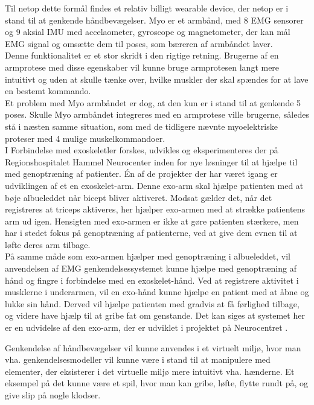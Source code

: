 Til netop dette formål findes et relativ billigt wearable device, der netop er i stand til at genkende håndbevægelser. Myo er et armbånd, med 8 EMG sensorer og 9 aksial IMU med accelaometer, gyroscope og magnetometer, der kan mål EMG signal og omsætte dem til poses, som bæreren af armbåndet laver. \\
Denne funktionalitet er et stor skridt i den rigtige retning. Brugerne af en armprotese med disse egenskaber vil kunne bruge armprotesen langt mere intuitivt og uden at skulle tænke over, hvilke muskler der skal spændes for at lave en bestemt kommando.\\
Et problem med Myo armbåndet er dog, at den kun er i stand til at genkende 5 poses. Skulle Myo armbåndet integreres med en armprotese ville brugerne, således stå i næsten samme situation, som med de tidligere nævnte myoelektriske proteser med 4 mulige muskelkommandoer.\\

I Forbindelse med exoskeletler forskes, udvikles og eksperimenteres der på Regionshospitalet Hammel Neurocenter inden for nye løsninger til at hjælpe til med genoptræning af patienter. Én af de projekter der har været igang er udviklingen af et en exoskelet-arm. Denne exo-arm skal hjælpe patienten med at bøje albueleddet når bicept bliver aktiveret. Modsat gælder det, når det registreres at triceps aktiveres, her hjælper exo-armen med at strække patientens arm ud igen. Hensigten med exo-armen er ikke at gøre patienten stærkere, men har i stedet fokus på genoptræning af patienterne, ved at give dem evnen til at løfte deres arm tilbage.\\

På samme måde som exo-armen hjælper med genoptræning i albueleddet, vil anvendelsen af EMG genkendelsessystemet kunne hjælpe med genoptræning af hånd og fingre i forbindelse med en exoskelet-hånd. Ved at registrere aktivitet i musklerne i underarmen, vil en exo-hånd kunne hjælpe en patient med at åbne og lukke sin hånd. Derved vil hjælpe patienten med gradvis at få førlighed tilbage, og videre have hjælp til at gribe fat om genstande. Det kan siges at systemet her er en udvidelse af den exo-arm, der er udviklet i projektet på Neurocentret \cite{exorapport}.

Genkendelse af håndbevægelser vil kunne anvendes i et virtuelt miljø, hvor man vha.  genkendelsesmodeller vil kunne være i stand til at manipulere med elementer, der eksisterer i det virtuelle miljø mere intuitivt vha. hænderne. Et eksempel på det kunne være et spil, hvor man kan gribe, løfte, flytte rundt på, og give slip på nogle klodser.

